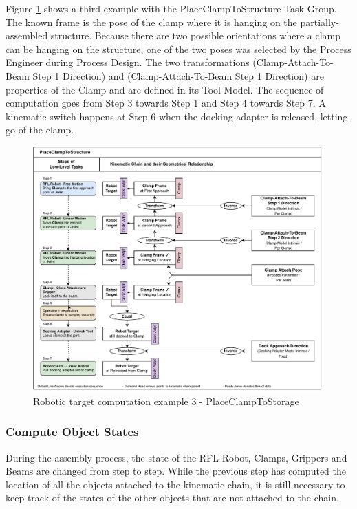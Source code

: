 Figure \ref{fig:chain-example-3} shows a third example with the PlaceClampToStructure Task Group. The known frame is the pose of the clamp where it is hanging on the partially-assembled structure. Because there are two possible orientations where a clamp can be hanging on the structure, one of the two poses was selected by the Process Engineer during Process Design. The two transformations (Clamp-Attach-To-Beam Step 1 Direction) and (Clamp-Attach-To-Beam Step 1 Direction) are properties of the Clamp and are defined in its Tool Model. The sequence of computation goes from Step 3 towards Step 1 and Step 4 towards Step 7. A kinematic switch happens at Step 6 when the docking adapter is released, letting go of the clamp.

\begin{figure}[!h]
    \centering
    \includegraphics[width=0.99\textwidth]{images/6a/motion-placeclamptostructure.pdf}
    \caption{Robotic target computation example 3 - PlaceClampToStorage}
    \label{fig:chain-example-3}
\end{figure}

\FloatBarrier

\subsubsection{Compute Object States}
\label{subsubsection:exploration-3-compute-object-states}

During the assembly process, the state of the RFL Robot, Clamps, Grippers and Beams are changed from step to step. While the previous step has computed the location of all the objects attached to the kinematic chain, it is still necessary to keep track of the states of the other objects that are not attached to the chain.

